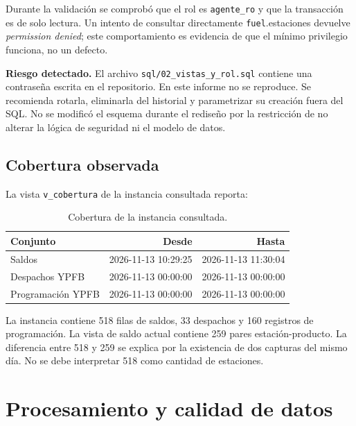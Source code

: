 \documentclass[12pt,a4paper]{article}
\newcommand{\fuel}{\texttt{fuel}}
\newcommand{\vista}[1]{\texttt{#1}}
\newcommand{\archivo}[1]{\texttt{#1}}
\begin{document}
Durante la validación se comprobó que el rol es \texttt{agente\_ro} y que la transacción es de solo lectura. Un intento de consultar directamente \fuel.estaciones devuelve \emph{permission denied}; este comportamiento es evidencia de que el mínimo privilegio funciona, no un defecto.

\textbf{Riesgo detectado.} El archivo \archivo{sql/02\_vistas\_y\_rol.sql} contiene una contraseña escrita en el repositorio. En este informe no se reproduce. Se recomienda rotarla, eliminarla del historial y parametrizar su creación fuera del SQL. No se modificó el esquema durante el rediseño por la restricción de no alterar la lógica de seguridad ni el modelo de datos.

\subsection{Cobertura observada}

La vista \vista{v\_cobertura} de la instancia consultada reporta:

\begin{table}[H]
\centering
\small
\caption{Cobertura de la instancia consultada.}
\label{tab:cobertura}
\begin{tabular}{@{}lrr@{}}
\toprule
\textbf{Conjunto} & \textbf{Desde} & \textbf{Hasta} \\
\midrule
Saldos & 2026-11-13 10:29:25 & 2026-11-13 11:30:04 \\
Despachos YPFB & 2026-11-13 00:00:00 & 2026-11-13 00:00:00 \\
Programación YPFB & 2026-11-13 00:00:00 & 2026-11-13 00:00:00 \\
\bottomrule
\end{tabular}
\end{table}

La instancia contiene 518 filas de saldos, 33 despachos y 160 registros de programación. La vista de saldo actual contiene 259 pares estación-producto. La diferencia entre 518 y 259 se explica por la existencia de dos capturas del mismo día. No se debe interpretar 518 como cantidad de estaciones.

\section{Procesamiento y calidad de datos}\label{sec:calidad}
\end{document}
